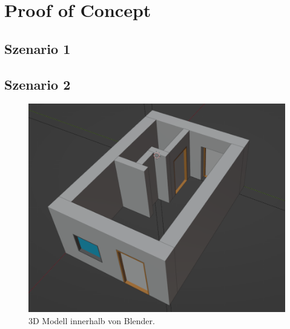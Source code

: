 \chapter{Proof of Concept}

\section{Szenario 1}\label{poc:scenario1}

\section{Szenario 2}
\begin{figure}[hb]
  \centering
  \includegraphics[width=0.5\columnwidth]{fig/scenario1_screenshot.png}
  \caption{3D Modell innerhalb von Blender.}
  \label{fig:poc:Scenario1 Screenshot}
\end{figure}
